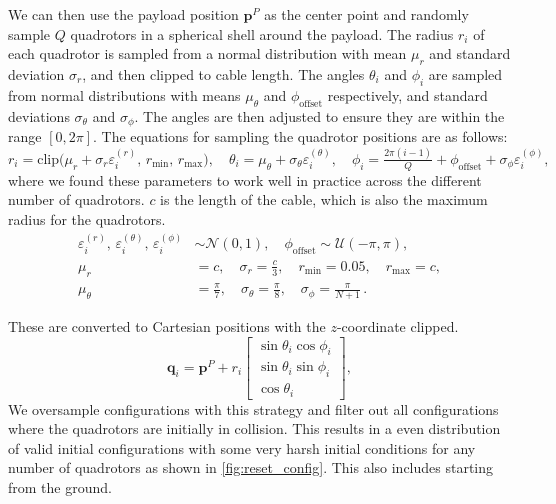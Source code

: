 We can then use the payload position $\mathbf{p}^P$ as the center point and randomly sample $Q$ quadrotors in a spherical shell around the payload. The radius $r_i$ of each quadrotor is sampled from a normal distribution with mean $\mu_r$ and standard deviation $\sigma_r$, and then clipped to cable length. The angles $\theta_i$ and $\phi_i$ are sampled from normal distributions with means $\mu_\theta$ and $\phi_{\mathrm{offset}}$ respectively, and standard deviations $\sigma_\theta$ and $\sigma_\phi$. The angles are then adjusted to ensure they are within the range $[0, 2\pi]$. The equations for sampling the quadrotor positions are as follows:
\begin{equation}
r_i = \mathrm{clip}\bigl(\mu_r+\sigma_r\varepsilon_i^{(r)},\,r_{\min},\,r_{\max}\bigr),\quad
\theta_i = \mu_\theta+\sigma_\theta\varepsilon_i^{(\theta)},\quad
\phi_i = \tfrac{2\pi(i-1)}{Q} + \phi_{\mathrm{offset}} + \sigma_\phi\varepsilon_i^{(\phi)},
\end{equation}
where we found these parameters to work well in practice across the different number of quadrotors. $c$ is the length of the cable, which is also the maximum radius for the quadrotors.
\begin{equation}
\begin{aligned}
\varepsilon_i^{(r)},\,\varepsilon_i^{(\theta)},\,\varepsilon_i^{(\phi)}
    &\sim \mathcal{N}(0,1), \quad
\phi_{\mathrm{offset}} \sim \mathcal{U}(-\pi,\pi),\\
\mu_r &= c,\quad
\sigma_r = \tfrac{c}{3},\quad
r_{\min} = 0.05,\quad
r_{\max} = c,\\
\mu_\theta &= \tfrac{\pi}{7},\quad
\sigma_\theta = \tfrac{\pi}{8},\quad
\sigma_\phi = \tfrac{\pi}{N+1}\,.
\end{aligned}
\end{equation}

These are converted to Cartesian positions with the $z$-coordinate clipped.
\begin{equation}
\mathbf{q}_i = \mathbf{p}^P + r_i
\begin{bmatrix}
\sin\theta_i\cos\phi_i\\
\sin\theta_i\sin\phi_i\\
\cos\theta_i
\end{bmatrix},
\end{equation}
We oversample configurations with this strategy and filter out all configurations where the quadrotors are initially in collision. This results in a even distribution of valid initial configurations with some very harsh initial conditions for any number of quadrotors as shown in \autoref{fig:reset_config}. This also includes starting from the ground. 


